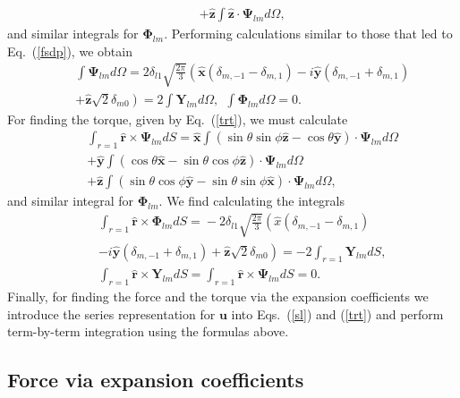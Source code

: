 \documentclass[aps,prx,twocolumn,amsmath,amssymb,amsfonts]{revtex4-2}
\begin{document}
{{\begin{appendices}
\begin{eqnarray}
\nonumber\\&&
+\bm{\hat z}\int \bm{\hat z}\cdot \bm \Psi_{lm}d\Omega,
\end{eqnarray}
and similar integrals for $\bm \Phi_{lm}$. Performing calculations similar to those that led to Eq.~(\ref{fsdp}), we obtain
\begin{eqnarray}&&
\int \bm \Psi_{lm}d\Omega\!=\!2\delta_{l1}\sqrt{\frac{2\pi}{3}}  \left(\bm{\hat x}(\delta_{m, -1}-\delta_{m, 1})\!-\! i\bm{\hat y}(\delta_{m, -1}+\delta_{m, 1})
\right.\nonumber\\&&\left.
+\bm{\hat z}\sqrt{2}\delta_{m0}\right) =2 \int \bm Y_{lm}d\Omega,
\ \
\int \bm \Phi_{lm}d\Omega\!=0.
\end{eqnarray}
For finding the torque, given by Eq.~(\ref{trt}), we must calculate
\begin{eqnarray}&&\!\!\!\!\!\!
 \int_{r=1} \!\bm {\hat r} \!\times\! \bm \Psi_{lm} dS\!=\!\bm{\hat x}\int \!\!\left(\sin\theta\sin\phi\bm{\hat z} -\cos\theta \bm{\hat y}\right) \cdot \bm \Psi_{lm}d\Omega
\!\!\!\!\!\! \nonumber\\&&
 +\bm{\hat y}\int\!\!\left(\cos\theta \bm{\hat x}-\sin\theta\cos\phi\bm{\hat z}\right) \cdot \bm \Psi_{lm}d\Omega
\!\!\!\!\!\!\nonumber\\&&
+\bm{\hat z}\int \left(\sin\theta\cos\phi\bm{\hat y}-\sin\theta\sin\phi\bm{\hat x}\right) \cdot \bm \Psi_{lm}d\Omega,
\end{eqnarray}
and similar integral for $\bm \Phi_{lm}$. We find calculating the integrals
\begin{eqnarray}&&\!\!\!\!\!\!
 \int_{r=1}\!\!\!\!\!\! \!\bm {\hat r} \!\times\! \bm \Phi_{lm} dS\!=
\!-2 \delta_{l1}\sqrt{\frac{2\pi}{3}}  \left({\hat x}(\delta_{m, -1}-\delta_{m, 1})\!
\right.\nonumber\\&&\!\!\!\!\!\!\left.
- i\bm{\hat y}(\delta_{m, -1}+\delta_{m, 1})
+\bm{\hat z}\sqrt{2}\delta_{m0}\right) = -2 \int_{r=1}\!\!\!\!\!\! \bm Y_{lm} dS,
\nonumber\\&&\!\!\!\!\!\!
 \int_{r=1}\!\!\!\!\!\! \!\bm {\hat r} \!\times\! \bm Y_{lm} dS\!=
 \int_{r=1}\!\!\!\!\!\! \!\bm {\hat r} \!\times\! \bm \Psi_{lm} dS\!=\! 0.
\end{eqnarray}
Finally, for finding the force and the torque via the expansion coefficients we introduce the series representation for $\bm u$ into Eqs.~(\ref{sl}) and (\ref{trt}) and perform term-by-term integration using the formulas above.

\subsection{Force via expansion coefficients}


\end{appendices}}}
\end{document}
